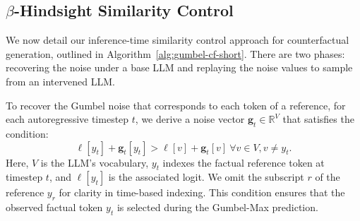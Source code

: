 \documentclass[letterpaper]{article} %
\begin{document}






\subsection{$\beta$-Hindsight Similarity Control}


We now detail our inference-time similarity control approach for counterfactual generation, outlined in Algorithm~\ref{alg:gumbel-cf-short}. There are two phases: recovering the noise under a base LLM and replaying the noise values to sample from an intervened LLM.

To recover the Gumbel noise that corresponds to each token of a reference, for each autoregressive timestep $t$, we derive a noise vector $\mathbf{g}_t \in \mathbb{R}^V$ that satisfies the condition: \begin{equation} \label{max-condition}
    \ell[{y_t}] + \mathbf{g}_t[{y_t}] > \ell[v] + \mathbf{g}_t[v]\  \forall v \in V, v \ne y_t.
\end{equation}
Here, $V$ is the LLM's vocabulary, $y_t$ indexes the factual reference token at timestep $t$, and $\ell[{y_t}]$ is the associated logit. We omit the subscript $r$ of the reference $y_r$ for clarity in time-based indexing. This condition ensures that the observed factual token $y_t$ is selected during the Gumbel-Max prediction.
\end{document}
